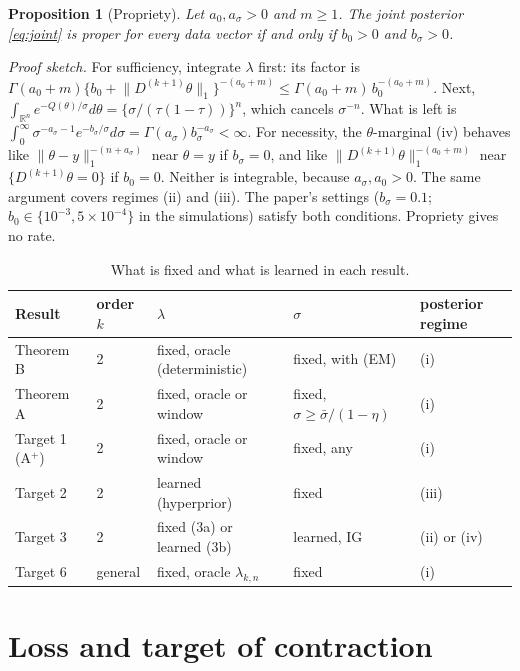 \documentclass[11pt]{article}
\newcommand{\R}{\mathbb{R}}
\newcommand{\norm}[1]{\lVert #1\rVert}
\newcommand{\Dk}{D^{(k+1)}}
\newcommand{\sbar}{\bar\sigma}
\theoremstyle{plain}
\newtheorem{proposition}{Proposition}
\theoremstyle{definition}
\theoremstyle{remark}
\begin{document}
\begin{proposition}[Propriety]
Let $a_0,a_\sigma>0$ and $m\ge1$. The joint posterior \eqref{eq:joint} is proper for every data vector if and only if $b_0>0$ and $b_\sigma>0$.
\end{proposition}
\noindent\textit{Proof sketch.} For sufficiency, integrate $\lambda$ first: its factor is $\Gamma(a_0+m)\{b_0+\norm{\Dk\theta}_1\}^{-(a_0+m)}\le\Gamma(a_0+m)\,b_0^{-(a_0+m)}$. Next, $\int_{\R^n}e^{-Q(\theta)/\sigma}d\theta=\{\sigma/(\tau(1-\tau))\}^n$, which cancels $\sigma^{-n}$. What is left is $\int_0^\infty\sigma^{-a_\sigma-1}e^{-b_\sigma/\sigma}d\sigma=\Gamma(a_\sigma)b_\sigma^{-a_\sigma}<\infty$. For necessity, the $\theta$-marginal (iv) behaves like $\norm{\theta-y}_1^{-(n+a_\sigma)}$ near $\theta=y$ if $b_\sigma=0$, and like $\norm{\Dk\theta}_1^{-(a_0+m)}$ near $\{\Dk\theta=0\}$ if $b_0=0$. Neither is integrable, because $a_\sigma,a_0>0$. The same argument covers regimes (ii) and (iii). The paper's settings ($b_\sigma=0.1$; $b_0\in\{10^{-3},5\times10^{-4}\}$ in the simulations) satisfy both conditions. Propriety gives no rate.

\begin{table}[h]
\centering\small
\caption{What is fixed and what is learned in each result.}
\label{tab:fixed}
\begin{tabular}{@{}lllll@{}}
\toprule
Result & order $k$ & $\lambda$ & $\sigma$ & posterior regime \\
\midrule
Theorem B & 2 & fixed, oracle (deterministic) & fixed, with (EM) & (i) \\
Theorem A & 2 & fixed, oracle or window & fixed, $\sigma\ge\sbar/(1-\eta)$ & (i) \\
Target 1 (A$^+$) & 2 & fixed, oracle or window & fixed, any & (i) \\
Target 2 & 2 & learned (hyperprior) & fixed & (iii) \\
Target 3 & 2 & fixed (3a) or learned (3b) & learned, IG & (ii) or (iv) \\
Target 6 & general & fixed, oracle $\lambda_{k,n}$ & fixed & (i) \\
\bottomrule
\end{tabular}
\end{table}

\section{Loss and target of contraction}
\label{sec:loss}
\end{document}
